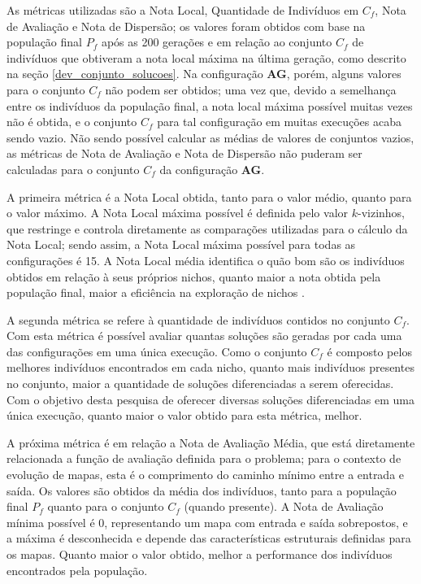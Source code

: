 As métricas utilizadas são a Nota Local, Quantidade de Indivíduos em $C_f$, Nota de Avaliação e Nota de Dispersão; os valores foram obtidos com base na população final $P_f$ após as 200 gerações e em relação ao conjunto $C_f$ de indivíduos que obtiveram a nota local máxima na última geração, como descrito na seção \ref{dev_conjunto_solucoes}. Na configuração \textbf{AG}, porém, alguns valores para o conjunto $C_f$ não podem ser obtidos; uma vez que, devido a semelhança entre os indivíduos da população final, a nota local máxima possível muitas vezes não é obtida, e o conjunto $C_f$ para tal configuração em muitas execuções acaba sendo vazio. Não sendo possível calcular as médias de valores de conjuntos vazios, as métricas de Nota de Avaliação e Nota de Dispersão não puderam ser calculadas para o conjunto $C_f$ da configuração \textbf{AG}.

A primeira métrica é a Nota Local obtida, tanto para o valor médio, quanto para o valor máximo. A Nota Local máxima possível é definida pelo valor $k$-vizinhos, que restringe e controla diretamente as comparações utilizadas para o cálculo da Nota Local; sendo assim, a Nota Local máxima possível para todas as configurações é 15. A Nota Local média identifica o quão bom são os indivíduos obtidos em relação à seus próprios nichos, quanto maior a nota obtida pela população final, maior a eficiência na exploração de nichos \cite{lehman2011evolving}.

A segunda métrica se refere à quantidade de indivíduos contidos no conjunto $C_f$. Com esta métrica é possível avaliar quantas soluções são geradas por cada uma das configurações em uma única execução. Como o conjunto $C_f$ é composto pelos melhores indivíduos encontrados em cada nicho, quanto mais indivíduos presentes no conjunto, maior a quantidade de soluções diferenciadas a serem oferecidas. Com o objetivo desta pesquisa de oferecer diversas soluções diferenciadas em uma única execução, quanto maior o valor obtido para esta métrica, melhor.

A próxima métrica é em relação a Nota de Avaliação Média, que está diretamente relacionada a função de avaliação definida para o problema; para o contexto de evolução de mapas, esta é o comprimento do caminho mínimo entre a entrada e saída. Os valores são obtidos da média dos indivíduos, tanto para a população final $P_f$ quanto para o conjunto $C_f$ (quando presente). A Nota de Avaliação mínima possível é 0, representando um mapa com entrada e saída sobrepostos, e a máxima é desconhecida e depende das características estruturais definidas para os mapas. Quanto maior o valor obtido, melhor a performance dos indivíduos encontrados pela população.

